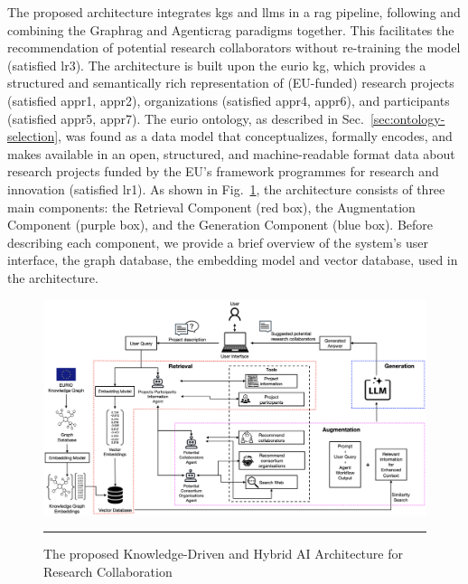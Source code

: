 The proposed architecture integrates \glspl{kg} and \glspl{llm} in a \gls{rag} pipeline, following and combining the Graph\gls{rag} and Agentic\gls{rag} paradigms together.
This facilitates the recommendation of potential research collaborators without re-training the model (satisfied \gls{lr}3).
The architecture is built upon the \gls{eurio} \gls{kg}, which provides a structured and semantically rich representation of (EU-funded) research projects (satisfied \gls{appr}1, \gls{appr}2), organizations (satisfied \gls{appr}4, \gls{appr}6), and participants (satisfied \gls{appr}5, \gls{appr}7).
The \gls{eurio} ontology, as described in Sec.~\ref{sec:ontology-selection}, was found as a data model that conceptualizes, formally encodes, and makes available in an open, structured, and machine-readable format data about research projects funded by the EU's framework programmes for research and innovation (satisfied \gls{lr}1).
As shown in Fig.~\ref{fig:proposed-system-graphRAG}, the architecture consists of three main components: the Retrieval Component (red box), the Augmentation Component (purple box), and the Generation Component (blue box).
Before describing each component, we provide a brief overview of the system's user interface, the graph database, the embedding model and vector database, used in the architecture.

\begin{figure}[htbp]
    \centering
 \includegraphics[width=.9\textwidth]{figures/architecture/proposed-system-graphRAG.png}
     \rule{35em}{0.5pt}
    \caption{The proposed Knowledge-Driven and Hybrid AI Architecture for Research Collaboration}
 \label{fig:proposed-system-graphRAG}
\end{figure}

